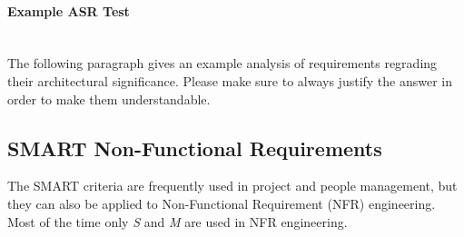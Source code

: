 \paragraph{Example ASR Test} \hfill \\
The following paragraph gives an example analysis of requirements regrading their architectural significance. Please make sure to always justify the answer in order to make them understandable.

\begin{table}[H]
\caption{Sample Requirement Analysis for Architectural Significance}
\end{table}

\subsection{SMART Non-Functional Requirements}
The SMART criteria are frequently used in project and people management, but they can also be applied to Non-Functional Requirement (NFR) engineering. Most of the time only \textit{S} and \textit{M} are used in NFR engineering.

